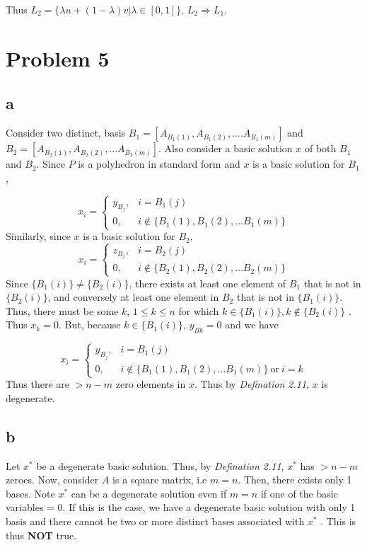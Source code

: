 \documentclass[11pt]{article}
\begin{document}
\noindent{}
Thus $L_2 = \{\lambda u + (1- \lambda)v | \lambda \in [0,1]\}$. $L_2 \Rightarrow L_1$.

\section*{Problem 5}
\subsection*{a}
Consider two distinct, basis $B_1 = [A_{B_1(1)},A_{B_1(2)},....A_{B_1(m)}]$ and $B_2 = [A_{B_2(1)},A_{B_2(2)},...A_{B_2(m)}]$. Also consider a basic solution $x$ of both $B_1$ and $B_2$. Since $P$ is a polyhedron in standard form and $x$ is a basic solution for $B_1$, 

\[
    x_i = 
    \begin{cases}
        y_{B_j}, & i = B_1(j)\\
        0,              & i\notin \{B_1(1), B_1(2),...B_1(m)\}
    \end{cases}
\]
Similarly, since $x$ is a basic solution for $B_2$,
\[
    x_i = 
    \begin{cases}
        z_{B_j}, & i = B_2(j)\\
        0,              & i\notin \{B_2(1), B_2(2),...B_2(m)\}
    \end{cases}
\]
Since $\{ B_1(i)\} \ne \{B_2(i)\}$, there exists at least one element of $B_1$ that is not in $\{B_2(i)\}$, and conversely at least one element in $B_2$ that is not in $\{B_1(i)\}$. Thus, there must be some $k$, $1 \le k \le n$ for which $k \in \{B_1(i)\}, k \notin \{B_2(i)\}$ . Thus $x_k = 0$. But, because $k \in \{B_1(i)\}$, $y_{Bk} = 0$ and we have

\[
    x_i = 
    \begin{cases}
        y_{B_j}, & i = B_1(j)\\
        0,              & i\notin \{B_1(1), B_1(2),...B_1(m)\}\ \text{or}\ i = k
    \end{cases}
\]
Thus there are $> n-m$ zero elements in $x$. Thus by \textit{Defination 2.11}, $x$ is degenerate.

\subsection*{b}
Let $x^*$ be a degenerate basic solution. Thus, by \textit{Defination 2.11}, $x^*$ has $> n-m$ zeroes. Now, consider $A$ is a square matrix, i.e $m = n$. Then, there exists only 1 bases. Note $x^*$ can be a degenerate solution even if $m=n$ if one of the basic variables = 0. If this is the case, we have a degenerate basic solution with only 1 basis and there cannot be two or more distinct bases associated with $x^*$ . This is thus \textbf{NOT} true.
\end{document}
